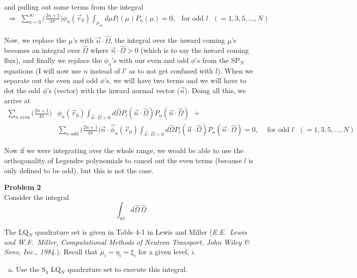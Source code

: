 \documentclass[10pt]{article}
\begin{document}
and pulling out some terms from the integral
%
\begin{align*}
    \Rightarrow\,\, \sum_{n=0}^{\infty}\Big(\frac{2n+1}{4\pi}\Big) \phi_n(\vec{r}_0)\int_{\mu_{in}} d\mu P_l(\mu)P_n(\mu) = 0,\ \ \textrm{  for odd $l$ }(=1,3,5,...,N)
\end{align*}


Now, we replace the $\mu$'s with $\vec{n}\cdot \hat{\Omega}$, the integral over the inward coming $\mu$'s becomes an integral over $\hat{\Omega}$ where $\vec{n}\cdot \hat{\Omega} > 0$ (which is to say the inward coming flux), and finally we replace the $\phi_n$'s with our even and odd $\phi$'s from the SP$_N$ equations (I will now use $n$ instead of $l'$ as to not get confused with $l$). When we separate out the even and odd $\phi$'s, we will have two terms and we will have to dot the odd $\phi$'s (vector) with the inward normal vector ($\vec{n}$). Doing all this, we arrive at
%
\begin{align*}
    \sum_{n\textrm{ even}}\Big(\frac{2n+1}{4\pi}\Big) &\phi_n(\vec{r}_0) \int_{\vec{n}\cdot \hat{\Omega} > 0} d\hat{\Omega} P_l(\vec{n}\cdot \hat{\Omega})P_n(\vec{n}\cdot \hat{\Omega}) \ \ + \\
    & \sum_{n\textrm{ odd}}\Big(\frac{2n+1}{4\pi}\Big) \vec{n} \cdot \vec{\phi}_n(\vec{r}_0) \int_{\vec{n}\cdot \hat{\Omega} > 0} d\hat{\Omega} P_l(\vec{n}\cdot \hat{\Omega})P_n(\vec{n}\cdot \hat{\Omega}) = 0,\ \ \ \ \textrm{  for odd $l$ }(=1,3,5,...,N)
\end{align*}

Now if we were integrating over the whole range, we would be able to use the orthogonality of Legendre polynomials to cancel out the even terms (because $l$ is only defined to be odd), but this is not the case.








\newpage
\noindent \textbf{Problem 2}\\
Consider the integral
%
\begin{equation*}
\int_{4\pi} d\hat{\Omega}\,\hat{\Omega}
\end{equation*}

The LQ$_N$ quadrature set is given in Table 4-1 in Lewis and Miller (\emph{E.E.~Lewis and W.F.~Miller, Computational Methods of Neutron Transport, John Wiley \& Sons, Inc., 1984.}). Recall that $\mu_i = \eta_i= \xi_i$ for a given level, $i$.
%
\begin{enumerate}[(a)]
\item Use the S$_4$ LQ$_N$ quadrature set to execute this integral.\\[-5pt]
\end{enumerate}
\end{document}
